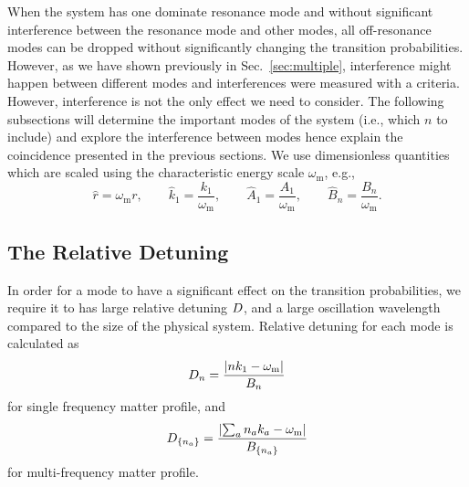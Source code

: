 When the system has one dominate resonance mode and without significant interference between the resonance mode and other modes, all off-resonance modes can be dropped without significantly changing the transition probabilities. However, as we have shown previously in Sec.~\ref{sec:multiple}, interference might happen between different modes and interferences were measured with a criteria. However, interference is not the only effect we need to consider. The following subsections will determine the important modes of the system (i.e., which $n$ to include) and explore the interference between modes hence explain the coincidence presented in the previous sections. We use dimensionless quantities which are scaled using the characteristic energy scale $\omega_{\mathrm{m}}$, e.g.,
\begin{equation}
    \hat r = \omega_{\mathrm{m}}r, \qquad
    \hat k_1  = \frac{k_1}{\omega_{\mathrm{m}}},  \qquad
    \hat A_1  = \frac{A_1}{\omega_{\mathrm{m}}},  \qquad
    \hat B_n = \frac{B_n}{\omega_{\mathrm{m}}}.
\end{equation}







\subsection{The Relative Detuning}


In order for a mode to have a significant effect on the transition probabilities, we require it to has large relative detuning $D$, and a large oscillation wavelength compared to the size of the physical system. Relative detuning for each mode is calculated as
\begin{equation}
D_n = \frac{\lvert n k_1 - \omega_{\mathrm{m}} \rvert}{B_n}
\end{equation}
for single frequency matter profile, and
\begin{equation}
D_{\{n_a\}} = \frac{\lvert \sum_a n_a k_a -\omega_{\mathrm m} \rvert }{B_{\{n_a\}}}
\end{equation}
for multi-frequency matter profile.


